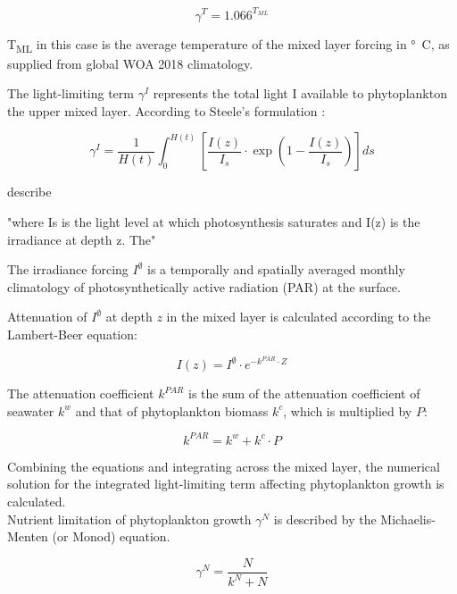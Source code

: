 \documentclass[template.tex]{subfiles}
\begin{document}
\begin{equation}
    \gamma^{T} = 1.066^{T_{ML}} \label{mumax}
\end{equation}

\unit{T_{ML}} in this case is the average temperature of the mixed layer forcing in \unit{\degree C}, as supplied from global WOA 2018 climatology.


The light-limiting term $\gamma^{I}$ represents the total light I available to phytoplankton the upper mixed layer. According to Steele’s formulation \cite{Steele1962EnvironmentalSea}:

\begin{equation}
    \gamma^{I} = \frac{1}{H(t)} \int_{0}^{H(t)}\left[ \frac{I(z)}{I_s} \cdot \exp{\left( 1 - \frac{I(z)}{I_s} \right) }  \right]ds \label{steele}
\end{equation}


describe 

"where Is is the light level at which photosynthesis saturates and I(z) is the irradiance at depth z. The"

The irradiance forcing $I^\emptyset$ is a temporally and spatially averaged monthly climatology of photosynthetically active radiation (PAR) at the surface. 

Attenuation of $I^\emptyset$ at depth $z$ in the mixed layer is calculated according to the Lambert-Beer equation:

\begin{equation}
    I(z) = I^\emptyset \cdot e^{-k^{PAR} \cdot Z} \label{beer}
\end{equation}

The attenuation coefficient $k^{PAR}$ is the sum of the attenuation coefficient of seawater $k^w$ and that of phytoplankton biomass $k^c$, which is multiplied by $P$:

\begin{equation}
    k^{PAR} = k^w + k^c \cdot P
\end{equation}

Combining the equations and integrating across the mixed layer, the numerical solution for the integrated light-limiting term affecting phytoplankton growth is calculated.\\

Nutrient limitation of phytoplankton growth $\gamma^N$ is described by the Michaelis-Menten (or Monod) equation.

\begin{equation}
    \gamma^N = \frac{N}{k^N + N}
\end{equation}
\end{document}
